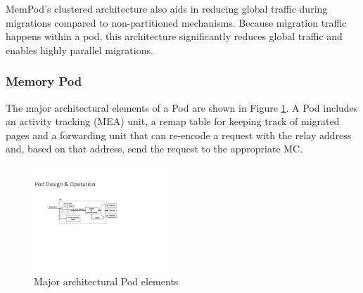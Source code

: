 MemPod's clustered architecture also aids in reducing global traffic during migrations compared to non-partitioned mechanisms.  Because migration
traffic happens within a pod, this architecture significantly reduces global
traffic and enables highly parallel migrations.

\subsubsection*{Memory Pod}

The major architectural elements of a Pod are shown in Figure \ref{fig:architecture_pod}. A Pod includes an activity tracking (MEA) unit, a remap table for keeping track of migrated pages and a forwarding unit that can re-encode a request with the relay address and, based on that address, send the request to the appropriate MC.

\begin{figure}[h]
  \includegraphics[width=0.46\textwidth]{figures/pod_design.pdf}
  \caption{Major architectural Pod elements}
  \label{fig:architecture_pod}
\end{figure}

